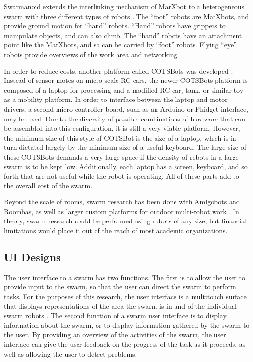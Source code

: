\documentclass[]{article}
\begin{document}
Swarmanoid extends the interlinking mechanism of MarXbot to a heterogeneous swarm with three different types of robots \cite{dorigo2013swarmanoid}.
The ``foot'' robots are MarXbots, and provide ground motion for ``hand'' robots. 
``Hand'' robots have grippers to manipulate objects, and can also climb.
The ``hand'' robots have an attachment point like the MarXbots, and so can be carried by ``foot'' robots. 
Flying ``eye'' robots provide overviews of the work area and networking.  

In order to reduce costs, another platform called COTSBots was developed \cite{soule2011cotsbots}.  
Instead of sensor motes on micro-scale RC cars, the newer COTSBots platform is composed of a laptop for processing and a modified RC car, tank, or similar toy as a mobility platform.
In order to interface between the laptop and motor drivers, a second micro-controller board, such as an Arduino or Phidget interface, may be used. 
Due to the diversity of possible combinations of hardware that can be assembled into this configuration, it is still a very viable platform. 
However, the minimum size of this style of COTSBot is the size of a laptop, which is in turn dictated largely by the minimum size of a useful keyboard. 
The large size of these COTSBots demands a very large space if the density of robots in a large swarm is to be kept low. 
Additionally, each laptop has a screen, keyboard, and so forth that are not useful while the robot is operating. 
All of these parts add to the overall cost of the swarm. 

Beyond the scale of rooms, swarm research has been done with Amigobots and Roombas, as well as larger custom platforms for outdoor multi-robot work \cite{guo2007bio, tammet2008rfid, olson2013cacm}.
In theory, swarm research could be performed using robots of any size, but financial limitations would place it out of the reach of most academic organizations. 

\subsection{UI Designs}

The user interface to a swarm has two functions. 
The first is to allow the user to provide input to the swarm, so that the user can direct the swarm to perform tasks. 
For the purposes of this research, the user interface is a multitouch surface that displays representations of the area the swarm is in and of the individual swarm robots \cite{micire2009multi}. 
The second function of a swarm user interface is to display information about the swarm, or to display information gathered by the swarm to the user. 
By providing an overview of the activities of the swarm, the user interface can give the user feedback on the progress of the task as it proceeds, as well as allowing the user to detect problems. 
\end{document}
